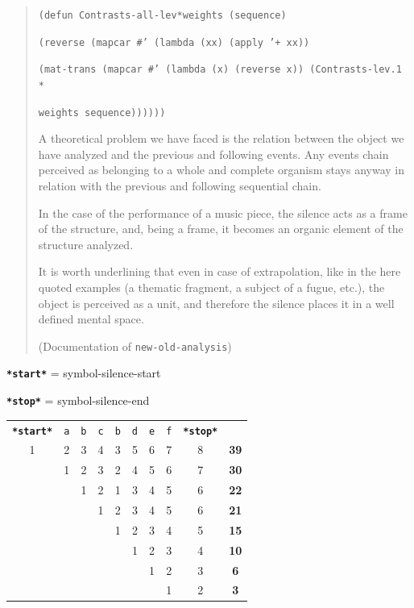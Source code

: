 \begin{quotation}
\noindent\texttt{\footnotesize (defun Contrasts-all-lev*weights (sequence)}

\noindent\texttt{\footnotesize \quad   (reverse (mapcar \#' (lambda (xx) (apply '+ xx))}

\noindent\texttt{\footnotesize \quad \quad (mat-trans (mapcar \#' (lambda (x) (reverse x)) (Contrasts-lev.1 *}

\noindent\texttt{\footnotesize \quad \quad \quad weights sequence))))))}

\begin{slshape} 
\noindent A theoretical problem we have faced is the relation between the object we have analyzed and the previous and following events. Any events chain perceived as belonging to a whole and complete organism stays anyway in relation with the previous and following sequential chain.

\noindent In the case of the performance of a music piece, the silence acts as a frame of the structure, and, being a frame, it becomes an organic element of the structure analyzed.

\noindent It is worth underlining that even in case of extrapolation, like in the here quoted examples (a thematic fragment, a subject of a fugue, etc.), the object is perceived as a unit, and therefore the silence places it in a well defined mental space.
\end{slshape}

\noindent (Documentation of \texttt{new-old-analysis})
\end{quotation} 

\noindent \texttt{\textbf{*start*}} = symbol-silence-start

\noindent \texttt{\textbf{*stop*}} = symbol-silence-end

\begin{center}
\begin{tabular}{cccccccccc}
  \cellcolor {gray!20} \texttt{\textbf{*start*}} & \cellcolor {gray!20} \texttt{a} & \cellcolor {gray!20} \texttt{b} & \cellcolor {gray!20} \texttt{c} & \cellcolor {gray!20} \texttt{b} & \cellcolor {gray!20} \texttt{d} & \cellcolor {gray!20} \texttt{e} & \cellcolor {gray!20} \texttt{f} & \cellcolor {gray!20} \texttt{\textbf{*stop*}} & \\
  1 & 2 & 3 & 4 & 3 & 5 & 6 & 7 & 8 & \cellcolor {gray!20} \bf 39 \\
    & 1 & 2 & 3 & 2 & 4 & 5 & 6 & 7 & \cellcolor {gray!20} \bf 30 \\
    &   & 1 & 2 & 1 & 3 & 4 & 5 & 6 & \cellcolor {gray!20} \bf 22 \\
    &   &   & 1 & 2 & 3 & 4 & 5 & 6 & \cellcolor {gray!20} \bf 21 \\
    &   &   &   & 1 & 2 & 3 & 4 & 5 & \cellcolor {gray!20} \bf 15 \\   
    &   &   &   &   & 1 & 2 & 3 & 4 & \cellcolor {gray!20} \bf 10 \\   
    &   &   &   &   &   & 1 & 2 & 3 & \cellcolor {gray!20} \bf 6 \\    
    &   &   &   &   &   &   & 1 & 2 & \cellcolor {gray!20} \bf 3 \\      
\end{tabular}
\end{center}

